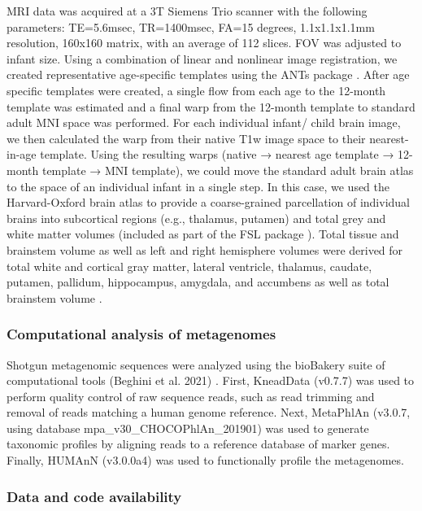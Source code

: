 \documentclass{article}
\begin{document}
MRI data was acquired at a 3T Siemens Trio scanner with the following
parameters: TE=5.6msec, TR=1400msec, FA=15 degrees, 1.1x1.1x1.1mm
resolution, 160x160 matrix, with an average of 112 slices. FOV was
adjusted to infant size. Using a combination of linear and nonlinear
image registration, we created representative age-specific templates
using the ANTs package \cite{avantsInsightToolKitImage2014}.
After age specific templates were created, a single flow from
each age to the 12-month template was estimated and a final warp from
the 12-month template to standard adult MNI space was performed. For
each individual infant/ child brain image, we then calculated the warp
from their native T1w image space to their nearest-in-age template.
Using the resulting warps (native → nearest age template → 12-month
template → MNI template), we could move the standard adult brain atlas
to the space of an individual infant in a single step. In this case, we
used the Harvard-Oxford brain atlas to provide a coarse-grained
parcellation of individual brains into subcortical regions (e.g.,
thalamus, putamen) and total grey and white matter volumes (included as
part of the FSL package \cite{jenkinsonFSL2012}).
Total tissue and brainstem volume as well as left and right
hemisphere volumes were derived for total white and cortical gray
matter, lateral ventricle, thalamus, caudate, putamen, pallidum,
hippocampus, amygdala, and accumbens as well as total brainstem volume
\cite{bruchhageLongitudinalBrainCognitive}.

\subsubsection*{Computational analysis of metagenomes}

Shotgun metagenomic sequences were analyzed using the bioBakery suite of
computational tools
(Beghini
et al. 2021)
\cite{}.
 First, KneadData (v0.7.7) was used to perform quality
control of raw sequence reads, such as read trimming and removal of
reads matching a human genome reference. Next, MetaPhlAn (v3.0.7, using
database mpa\_v30\_CHOCOPhlAn\_201901) was used to generate taxonomic
profiles by aligning reads to a reference database of marker genes.
Finally, HUMAnN (v3.0.0a4) was used to functionally profile the
metagenomes.

\subsubsection*{Data and code availability}
\end{document}
